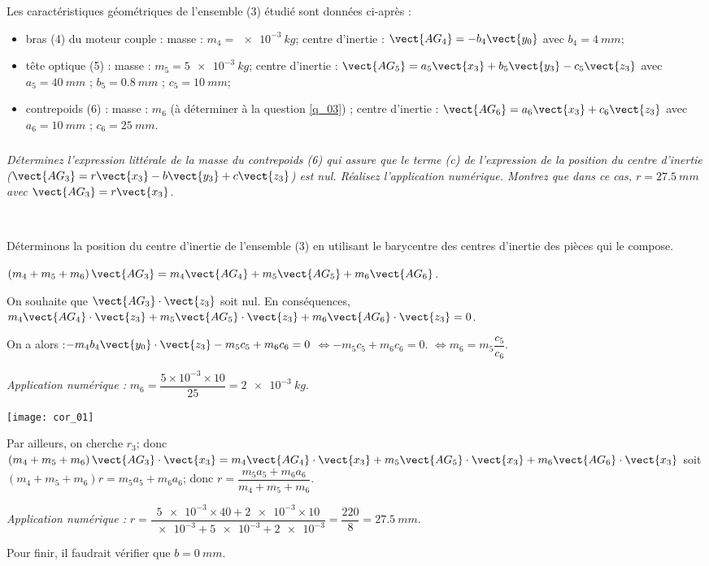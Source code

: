 Les caractéristiques géométriques de l’ensemble (3) étudié sont données ci-après :
\begin{itemize}
\item bras (4) du moteur couple : masse : $m_4=\SI{e-3}{kg}$; centre d’inertie : $\vect{AG_4} = - b_4 \vect{y_0}$ avec $b_4 =  \SI{4}{mm}$;
\item tête optique (5) : masse : $m_5= \SI{5e-3}{kg}$; centre d’inertie : $\vect{AG_5}= a_5 \vect{x_3}+b_5 \vect{y_3}-c_5 \vect{z_3}$ avec $a_5 = \SI{40}{mm}$ ; $b_5 = \SI{0,8}{mm}$ ; $c_5 = \SI{10}{mm}$;
\item contrepoids (6) : masse : $m_6$ (à déterminer à la question \ref{q_03}) ; centre d’inertie :
$\vect{AG_6}= a_6 \vect{x_3}+c_6 \vect{z_3}$ avec $a_6 = \SI{10}{mm}$ ; $c_6 = \SI{25}{mm}$.
\end{itemize}
\fi

\subparagraph{\label{q_03}}\textit{Déterminez l’expression littérale de la masse du contrepoids (6) qui assure que le terme (c) de l’expression de la position du centre d’inertie ($\vect{AG_3}=r\vect{x_3} - b\vect{y_3} + c\vect{z_3}$) est nul. Réalisez l’application numérique. Montrez que dans ce cas, $r=\SI{27,5}{mm}$ avec $\vect{AG_3}=r\vect{x_3}$.}
\ifprof
\begin{corrige} ~\\
\begin{minipage}[c]{.7\linewidth}
Déterminons la position du centre d'inertie de l'ensemble (3) en utilisant le barycentre des centres d'inertie des pièces qui le compose.

$\left(m_4 + m_5 +m_6 \right) \vect{AG_3} = m_4 \vect{AG_4}+m_5 \vect{AG_5}+m_6 \vect{AG_6} $. 

On souhaite que  $\vect{AG_3}\cdot \vect{z_3}$ soit nul. En conséquences, 
$ m_4 \vect{AG_4} \cdot \vect{z_3}+m_5 \vect{AG_5}\cdot \vect{z_3}+m_6 \vect{AG_6}\cdot \vect{z_3} = 0 $. 

On a alors :$ - m_4 b_4 \vect{y_0} \cdot \vect{z_3} - m_5 c_5 +m_6 c_6  = 0 $
$\Leftrightarrow  - m_5 c_5 +m_6 c_6  = 0 $.
$\Leftrightarrow   m_6   = m_5 \dfrac{c_5}{c_6}$.
 
\textit{Application numérique : } $m_6 = \dfrac{5\times 10^{-3} \times 10}{25} = \SI{2e-3}{kg}$.

\end{minipage} \hfill
\begin{minipage}[c]{.25\linewidth}
\begin{center}
\texttt{[image: cor\_01]}
\end{center}
\end{minipage}

Par ailleurs, on cherche $r_3$; donc
$\left(m_4 + m_5 +m_6 \right) \vect{AG_3}\cdot \vect{x_3} = m_4 \vect{AG_4}\cdot \vect{x_3}+m_5 \vect{AG_5}\cdot \vect{x_3}+m_6 \vect{AG_6}\cdot \vect{x_3} $  
soit 
$\left(m_4 + m_5 +m_6 \right) r =m_5 a_5+m_6 a_6 $; donc $ r =\dfrac{m_5 a_5+ m_6a_6}{m_4 + m_5 +m_6 } $.

\textit{Application numérique : } $r = \dfrac{\num{5e-3}\times 40 + \num{2e-3}\times 10}{\num{e-3}+ \num{5e-3} + \num{2e-3}} = \dfrac{220}{8}=\SI{27,5}{mm}$.

Pour finir, il faudrait vérifier que $b=\SI{0}{mm}$.
\end{corrige}
\else
\fi
